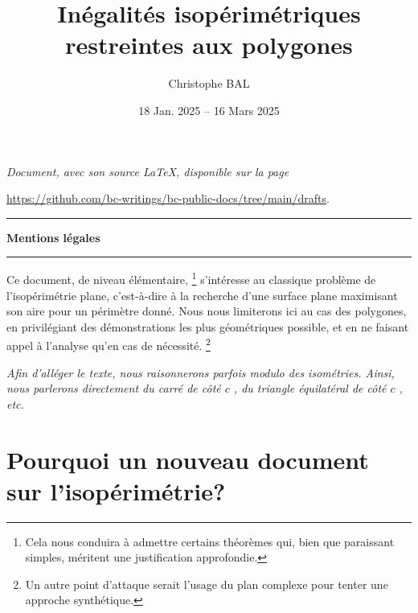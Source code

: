 \documentclass[12pt]{amsart}
\begin{document}
\title{Inégalités isopérimétriques restreintes aux polygones}
\author{Christophe BAL}
\date{18 Jan. 2025 -- 16 Mars 2025}

\maketitle

\begin{center}
	\itshape
	Document, avec son source \LaTeX, disponible sur la page

	\url{https://github.com/bc-writings/bc-public-docs/tree/main/drafts}.
\end{center}


\bigskip


\begin{center}
	\hrule\vspace{.3em}
	{
		\fontsize{1.35em}{1em}\selectfont
		\textbf{Mentions \og légales \fg}
	}

	\vspace{0.45em}
	\doclicenseThis
	\hrule
\end{center}



\setcounter{tocdepth}{2}
\tableofcontents




\newpage

Ce document, de niveau élémentaire,%
\footnote{
    Cela nous conduira à admettre certains théorèmes qui, bien que paraissant simples, méritent une justification approfondie.
}
s'intéresse au classique problème de l'isopérimétrie plane, c'est-à-dire à la recherche d'une surface plane maximisant son aire pour un périmètre donné.
Nous nous limiterons ici au cas des polygones, en privilégiant des démonstrations les plus géométriques possible, et en ne faisant appel à l'analyse qu'en cas de nécessité.%
\footnote{
    Un autre point d'attaque serait l'usage du plan complexe pour tenter une approche synthétique.
}


\begin{tcolorbox}
    \itshape\small
    Afin d'alléger le texte, nous raisonnerons parfois modulo des isométries. Ainsi, nous parlerons directement du \og carré de côté \( c \) \fg, du \og triangle équilatéral de côté \( c \) \fg, etc.
\end{tcolorbox}




\section{Pourquoi un  nouveau document sur l'isopérimétrie?}

\end{document}
